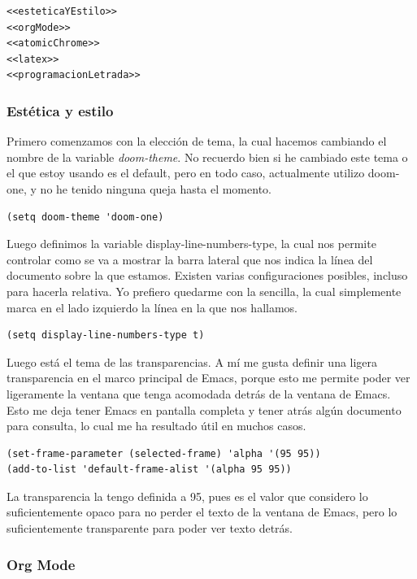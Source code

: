 \documentclass[11pt]{article}
\begin{document}
\begin{verbatim}
<<esteticaYEstilo>>
<<orgMode>>
<<atomicChrome>>
<<latex>>
<<programacionLetrada>>
\end{verbatim}
\subsubsection{Estética y estilo}
\label{sec:org2f58392}

Primero comenzamos con la elección de tema, la cual hacemos cambiando el nombre de la variable \emph{doom-theme}. No recuerdo bien si he cambiado este tema o el que estoy usando es el default, pero en todo caso, actualmente utilizo doom-one, y no he tenido ninguna queja hasta el momento.

\begin{verbatim}
(setq doom-theme 'doom-one)
\end{verbatim}

Luego definimos la variable display-line-numbers-type, la cual nos permite controlar como se va a mostrar la barra lateral que nos indica la línea del documento sobre la que estamos. Existen varias configuraciones posibles, incluso para hacerla relativa. Yo prefiero quedarme con la sencilla, la cual simplemente marca en el lado izquierdo la línea en la que nos hallamos.

\begin{verbatim}
(setq display-line-numbers-type t)
\end{verbatim}

Luego está el tema de las transparencias. A mí me gusta definir una ligera transparencia en el marco principal de Emacs, porque esto me permite poder ver ligeramente la ventana que tenga acomodada detrás de la ventana de Emacs. Esto me deja tener Emacs en pantalla completa y tener atrás algún documento para consulta, lo cual me ha resultado útil en muchos casos.

\begin{verbatim}
(set-frame-parameter (selected-frame) 'alpha '(95 95))
(add-to-list 'default-frame-alist '(alpha 95 95))
\end{verbatim}

La transparencia la tengo definida a 95, pues es el valor que considero lo suficientemente opaco para no perder el texto de la ventana de Emacs, pero lo suficientemente transparente para poder ver texto detrás.
\subsubsection{Org Mode}
\label{sec:org12061c9}
\end{document}
